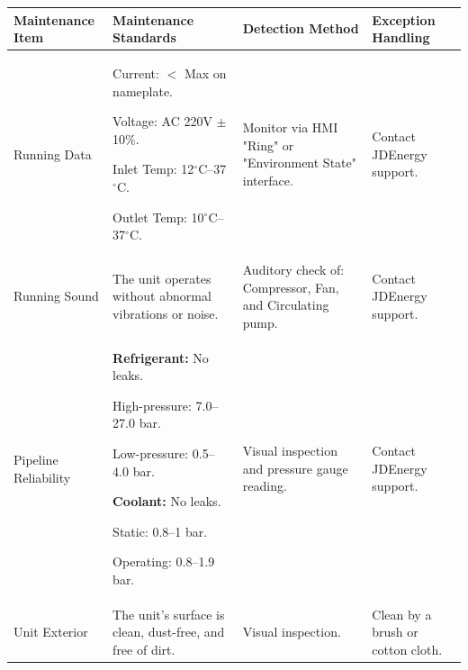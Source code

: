 \documentclass[11pt, a4paper]{article}
\newcommand{\sffont}{\sffamily\fontseries{b}\selectfont}
\begin{document}
\begin{tabularx}{\textwidth}{>{\sffont\raggedright\arraybackslash}p{2.2cm} >{\raggedright\arraybackslash}p{5.2cm} >{\raggedright\arraybackslash}p{4cm} X}
\toprule
\textbf{Maintenance Item} & \textbf{Maintenance Standards} & \textbf{Detection Method} & \textbf{Exception Handling} \\
\midrule
Running Data & 
Current: $<$ Max on nameplate.\par
Voltage: AC 220V $\pm$10\%.\par
Inlet Temp: 12$^\circ$C--37$^\circ$C.\par
Outlet Temp: 10$^\circ$C--37$^\circ$C. & 
Monitor via HMI "Ring" or "Environment State" interface. & 
Contact JDEnergy support. \\
\addlinespace

Running Sound & 
The unit operates without abnormal vibrations or noise. & 
Auditory check of: Compressor, Fan, and Circulating pump. & 
Contact JDEnergy support. \\
\addlinespace

Pipeline \newline Reliability & 
\textbf{Refrigerant:} No leaks. \par High-pressure: 7.0--27.0 bar. \par Low-pressure: 0.5--4.0 bar.\par
\textbf{Coolant:} No leaks. \par Static: 0.8--1 bar. \par Operating: 0.8--1.9 bar. & 
Visual inspection and pressure gauge reading. & 
Contact JDEnergy support. \\
\addlinespace

Unit \newline Exterior & 
The unit's surface is clean, dust-free, and free of dirt. & 
Visual inspection. & 
Clean by a brush or cotton cloth. \\
\bottomrule
\end{tabularx}
\end{document}
